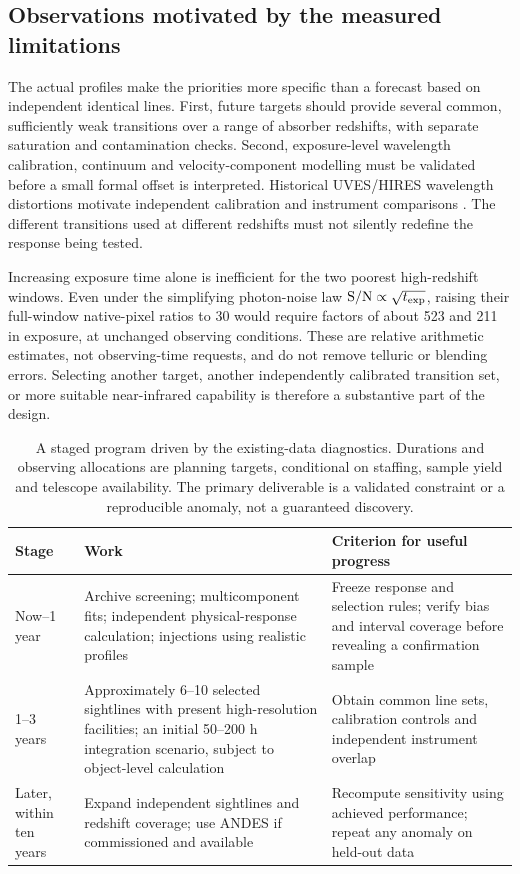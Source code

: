 \subsection{Observations motivated by the measured limitations}
The actual profiles make the priorities more specific than a forecast based on independent identical lines. First, future targets should provide several common, sufficiently weak transitions over a range of absorber redshifts, with separate saturation and contamination checks. Second, exposure-level wavelength calibration, continuum and velocity-component modelling must be validated before a small formal offset is interpreted. Historical UVES/HIRES wavelength distortions motivate independent calibration and instrument comparisons \cite{WhitmoreMurphy2015}. The different transitions used at different redshifts must not silently redefine the response being tested.

Increasing exposure time alone is inefficient for the two poorest high-redshift windows. Even under the simplifying photon-noise law ${\rm S/N}\propto\sqrt{t_{\rm exp}}$, raising their full-window native-pixel ratios to 30 would require factors of about 523 and 211 in exposure, at unchanged observing conditions. These are relative arithmetic estimates, not observing-time requests, and do not remove telluric or blending errors. Selecting another target, another independently calibrated transition set, or more suitable near-infrared capability is therefore a substantive part of the design.

\begin{table}[htbp]
\caption{A staged program driven by the existing-data diagnostics. Durations and observing allocations are planning targets, conditional on staffing, sample yield and telescope availability. The primary deliverable is a validated constraint or a reproducible anomaly, not a guaranteed discovery.}
\label{tab:highz_roadmap}
\centering
\begin{tabular}{p{}p{}p{}}
\toprule
Stage & Work & Criterion for useful progress\\
\midrule
Now--1 year & Archive screening; multicomponent fits; independent physical-response calculation; injections using realistic profiles & Freeze response and selection rules; verify bias and interval coverage before revealing a confirmation sample\\
1--3 years & Approximately 6--10 selected sightlines with present high-resolution facilities; an initial 50--200 h integration scenario, subject to object-level calculation & Obtain common line sets, calibration controls and independent instrument overlap\\
Later, within ten years & Expand independent sightlines and redshift coverage; use ANDES if commissioned and available & Recompute sensitivity using achieved performance; repeat any anomaly on held-out data\\
\bottomrule
\end{tabular}
\end{table}

